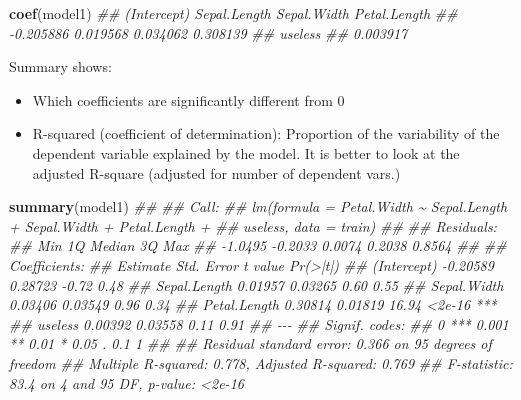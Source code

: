 \documentclass[
  notitlepage]{book}
\newenvironment{Shaded}{\begin{snugshade}}{\end{snugshade}}
\newcommand{\CommentTok}[1]{\textcolor[rgb]{0.56,0.35,0.01}{\textit{#1}}}
\newcommand{\KeywordTok}[1]{\textcolor[rgb]{0.13,0.29,0.53}{\textbf{#1}}}
\newcommand{\NormalTok}[1]{#1}
\providecommand{\tightlist}{%
  \setlength{\itemsep}{0pt}\setlength{\parskip}{0pt}}
\begin{document}
\begin{Shaded}
\begin{Highlighting}[]
\KeywordTok{coef}\NormalTok{(model1)}
\CommentTok{\#\#  (Intercept) Sepal.Length  Sepal.Width Petal.Length }
\CommentTok{\#\#    {-}0.205886     0.019568     0.034062     0.308139 }
\CommentTok{\#\#      useless }
\CommentTok{\#\#     0.003917}
\end{Highlighting}
\end{Shaded}

Summary shows:

\begin{itemize}
\tightlist
\item
  Which coefficients are significantly different from 0
\item
  R-squared (coefficient of determination): Proportion of the variability of the dependent variable explained by the model. It is better to look at the adjusted R-square (adjusted for number of dependent vars.)
\end{itemize}

\begin{Shaded}
\begin{Highlighting}[]
\KeywordTok{summary}\NormalTok{(model1)}
\CommentTok{\#\# }
\CommentTok{\#\# Call:}
\CommentTok{\#\# lm(formula = Petal.Width \textasciitilde{} Sepal.Length + Sepal.Width + Petal.Length + }
\CommentTok{\#\#     useless, data = train)}
\CommentTok{\#\# }
\CommentTok{\#\# Residuals:}
\CommentTok{\#\#     Min      1Q  Median      3Q     Max }
\CommentTok{\#\# {-}1.0495 {-}0.2033  0.0074  0.2038  0.8564 }
\CommentTok{\#\# }
\CommentTok{\#\# Coefficients:}
\CommentTok{\#\#              Estimate Std. Error t value Pr(\textgreater{}|t|)    }
\CommentTok{\#\# (Intercept)  {-}0.20589    0.28723   {-}0.72     0.48    }
\CommentTok{\#\# Sepal.Length  0.01957    0.03265    0.60     0.55    }
\CommentTok{\#\# Sepal.Width   0.03406    0.03549    0.96     0.34    }
\CommentTok{\#\# Petal.Length  0.30814    0.01819   16.94   \textless{}2e{-}16 ***}
\CommentTok{\#\# useless       0.00392    0.03558    0.11     0.91    }
\CommentTok{\#\# {-}{-}{-}}
\CommentTok{\#\# Signif. codes:  }
\CommentTok{\#\# 0 \textquotesingle{}***\textquotesingle{} 0.001 \textquotesingle{}**\textquotesingle{} 0.01 \textquotesingle{}*\textquotesingle{} 0.05 \textquotesingle{}.\textquotesingle{} 0.1 \textquotesingle{} \textquotesingle{} 1}
\CommentTok{\#\# }
\CommentTok{\#\# Residual standard error: 0.366 on 95 degrees of freedom}
\CommentTok{\#\# Multiple R{-}squared:  0.778,  Adjusted R{-}squared:  0.769 }
\CommentTok{\#\# F{-}statistic: 83.4 on 4 and 95 DF,  p{-}value: \textless{}2e{-}16}
\end{Highlighting}
\end{Shaded}
\end{document}
